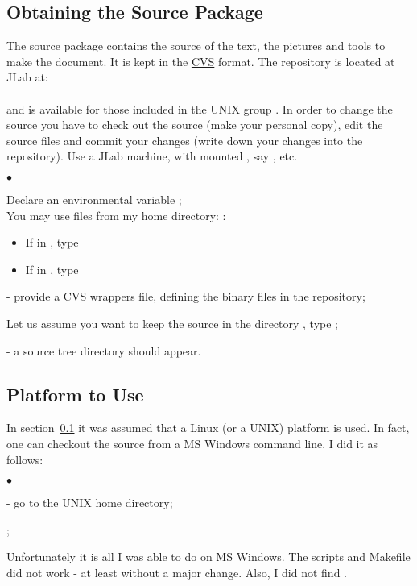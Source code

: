 \documentclass[12pt,letterpaper]{article}
\begin{document}
\subsection{Obtaining the Source Package}
\label{sec:obtain}

 The source package contains the source of the text, 
 the pictures and tools to make the document.
 It is kept in the \href{http://www.cvshome.org/}{CVS}\cite{CVSwww} format.
 The repository is located at JLab at: \\
  \\
 and is available for those included in the UNIX group .
 In order to change the source you have to check out the source
 (make your personal copy), edit the source files and commit
 your changes (write down your changes into the repository). Use
 a JLab machine, with mounted , say ,  etc.
  \begin{list}{$\bullet$}{\setlength{\itemsep}{-0.15cm}}
    \item Declare an environmental variable ;\\
          You may use files from my home directory: :
        \begin{itemize} 
            \item If in , type 
            \item If in , type 
        \end{itemize}
    \item {} - provide a CVS wrappers file,
           defining the binary files in the repository;
    \item Let us assume you want to keep the source in the directory ,
          type ;
    \item {} - a source tree directory 
          should appear. 
  \end{list}
 
   
\subsection{Platform to Use}
\label{sec:platform}   

  In section~\ref{sec:obtain} it was assumed that a Linux (or a UNIX) platform
  is used. In fact, one can checkout the source from a MS Windows command line.
  I did it as follows:
  \begin{list}{$\bullet$}{\setlength{\itemsep}{-0.15cm}}
    \item {} - go to the UNIX home directory;
    \item {};
  \end{list}
  Unfortunately it is all I was able to do on MS Windows.
  The scripts and Makefile did not work - at least without
  a major change. Also, I did not find .
\end{document}
